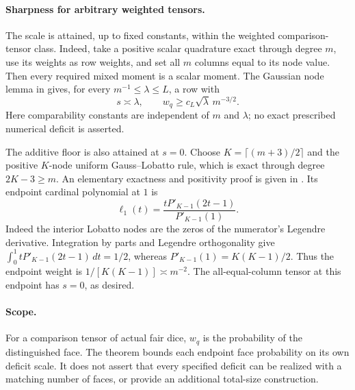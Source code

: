 \documentclass[11pt]{article}
\begin{document}
\paragraph{Sharpness for arbitrary weighted tensors.}
The scale is attained, up to fixed constants, within the weighted
comparison-tensor class. Indeed, take a positive scalar quadrature
exact through degree $m$, use its weights as row weights, and set
all $m$ columns equal to its node value. Then every required mixed
moment is a scalar moment. The Gaussian node lemma in
gives, for every $m^{-1}\le\lambda\le L$, a row with
\[
 s\asymp\lambda,\qquad
 w_q\ge c_L\sqrt\lambda\,m^{-3/2}.
\]
Here comparability constants are independent of $m$ and $\lambda$;
no exact prescribed numerical deficit is asserted.

The additive floor is also attained at $s=0$. Choose
$K=\lceil(m+3)/2\rceil$ and the positive $K$-node uniform
Gauss--Lobatto rule, which is exact through degree $2K-3\ge m$.
An elementary exactness and positivity proof is given in
. Its endpoint cardinal
polynomial at $1$ is
\[
 \ell_1(t)=\frac{tP'_{K-1}(2t-1)}{P'_{K-1}(1)}.
\]
Indeed the interior Lobatto nodes are the zeros of the numerator's
Legendre derivative. Integration by parts and Legendre orthogonality
give $\int_0^1tP'_{K-1}(2t-1)\,dt=1/2$, whereas
$P'_{K-1}(1)=K(K-1)/2$. Thus the endpoint weight is
$1/[K(K-1)]\asymp m^{-2}$. The all-equal-column tensor at this
endpoint has $s=0$, as desired.

\paragraph{Scope.}
For a comparison tensor of actual fair dice, $w_q$ is the probability
of the distinguished face. The theorem bounds each endpoint face
probability on its own deficit scale. It does not assert that every
specified deficit can be realized with a matching number of faces,
or provide an additional total-size construction.
\end{document}

